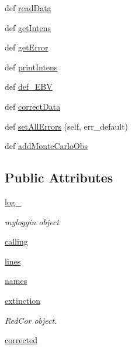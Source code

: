 \begin{DoxyCompactItemize}
\item 
def \hyperlink{classpyneb_1_1core_1_1pynebcore_1_1_observation_a47ca1f35468a585901b8e5d726d10aa1}{read\+Data}
\item 
def \hyperlink{classpyneb_1_1core_1_1pynebcore_1_1_observation_aa802bda219ff354ea1392e4b197fad1d}{get\+Intens}
\item 
def \hyperlink{classpyneb_1_1core_1_1pynebcore_1_1_observation_afa728d7fca929fe4e891f31746749777}{get\+Error}
\item 
def \hyperlink{classpyneb_1_1core_1_1pynebcore_1_1_observation_aa29e53677935b79960b6bdc74fef04ee}{print\+Intens}
\item 
def \hyperlink{classpyneb_1_1core_1_1pynebcore_1_1_observation_a63b6d1eeb5f04c67822fa786ba0df0a2}{def\+\_\+\+E\+B\+V}
\item 
def \hyperlink{classpyneb_1_1core_1_1pynebcore_1_1_observation_a8e31aa077dfbd7c1265fd9f1c0aa48e2}{correct\+Data}
\item 
def \hyperlink{classpyneb_1_1core_1_1pynebcore_1_1_observation_a5c0e42aa130d5590dcbace26b7052dc4}{set\+All\+Errors} (self, err\+\_\+default)
\item 
def \hyperlink{classpyneb_1_1core_1_1pynebcore_1_1_observation_a72b195b630dd91ce62c2fa324e2ceb66}{add\+Monte\+Carlo\+Obs}
\end{DoxyCompactItemize}
\subsection*{Public Attributes}
\begin{DoxyCompactItemize}
\item 
\hyperlink{classpyneb_1_1core_1_1pynebcore_1_1_observation_afd87151907f32bc0dc45f0171b61374e}{log\+\_\+}
\begin{DoxyCompactList}\small\item\em myloggin object \end{DoxyCompactList}\item 
\hyperlink{classpyneb_1_1core_1_1pynebcore_1_1_observation_ab25fa7ebe84b603684dee62410c1e34c}{calling}
\item 
\hyperlink{classpyneb_1_1core_1_1pynebcore_1_1_observation_a22ea78f101680108434cb132f12afa0a}{lines}
\item 
\hyperlink{classpyneb_1_1core_1_1pynebcore_1_1_observation_a7d9df0b08f5a808d295f7a8335151070}{names}
\item 
\hyperlink{classpyneb_1_1core_1_1pynebcore_1_1_observation_a1f0d047efde58dcd55d16811d0221f43}{extinction}
\begin{DoxyCompactList}\small\item\em Red\+Cor object. \end{DoxyCompactList}\item 
\hyperlink{classpyneb_1_1core_1_1pynebcore_1_1_observation_a439dda562826dd28b863fff170a5beb3}{corrected}
\end{DoxyCompactItemize}


